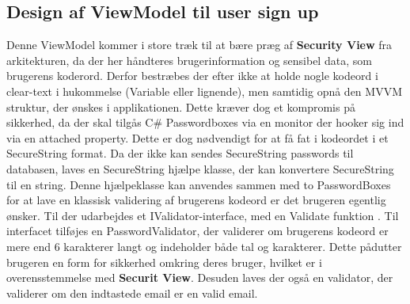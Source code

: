 \documentclass[SoftwareDesign/SoftwareDesign_main.tex]{subfiles}
\begin{document}
\subsection{Design af ViewModel til user sign up}
Denne ViewModel kommer i store træk til at bære præg af \textbf{Security View} fra arkitekturen, da der her håndteres brugerinformation og sensibel data, som brugerens koderord. Derfor bestræbes der efter ikke at holde nogle kodeord i clear-text i hukommelse (Variable eller lignende), men samtidig opnå den MVVM struktur, der ønskes i applikationen. Dette kræver dog et kompromis på sikkerhed, da der skal tilgås C\# Passwordboxes via en monitor der hooker sig ind via en attached property. Dette er dog nødvendigt for at få fat i kodeordet i et SecureString format. Da der ikke kan sendes SecureString passwords til databasen, laves en SecureString hjælpe klasse, der kan konvertere SecureString til en string. Denne hjælpeklasse kan anvendes sammen med to PasswordBoxes for at lave en klassisk validering af brugerens kodeord er det brugeren egentlig ønsker. Til der udarbejdes et IValidator-interface, med en Validate funktion . Til interfacet tilføjes en PasswordValidator, der validerer om brugerens kodeord er mere end 6 karakterer langt og indeholder både tal og karakterer. Dette pådutter brugeren en form for sikkerhed omkring deres bruger, hvilket er i overensstemmelse med \textbf{Securit View}. Desuden laves der også en validator, der validerer om den indtastede email er en valid email.
\end{document}
